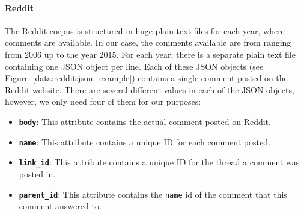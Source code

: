
\paragraph{Reddit} The Reddit corpus is structured in huge plain text files for each year, where comments are available. In our case, the comments available are from ranging from 2006 up to the year 2015. For each year, there is a separate plain text file containing one JSON object per line. Each of these JSON objects (see Figure~\ref{data:reddit:json_example}) contains a single comment posted on the Reddit website. There are several different values in each of the JSON objects, however, we only need four of them for our purposes: 

\begin{itemize}[noitemsep]
	\item \textbf{\texttt{body}}: This attribute contains the actual comment posted on Reddit.
	\item \textbf{\texttt{name}}: This attribute contains a unique ID for each comment posted.
	\item \textbf{\texttt{link\_id}}: This attribute contains a unique ID for the thread a comment was posted in.
	\item \textbf{\texttt{parent\_id}}: This attribute contains the \texttt{name} id of the comment that this comment answered to.
\end{itemize}

